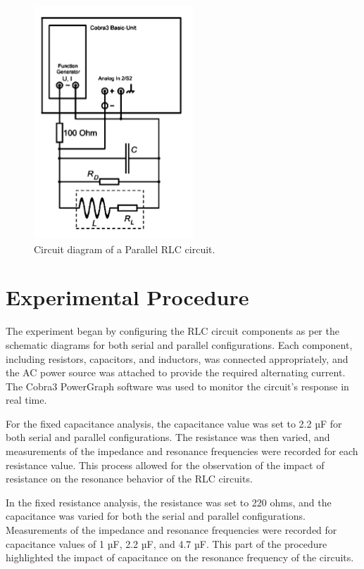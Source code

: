 \documentclass[journal]{IEEEtran}
\begin{document}
\begin{figure}[H]
    \centering
    \includegraphics[width=0.5\linewidth]{IMAGES/parallel_diagram.png}
    \caption{Circuit diagram of a Parallel RLC circuit.}
    \label{fig:parallel_circuit}
\end{figure}

\section{Experimental Procedure}
The experiment began by configuring the RLC circuit components as per the schematic diagrams for both serial and parallel configurations. Each component, including resistors, capacitors, and inductors, was connected appropriately, and the AC power source was attached to provide the required alternating current. The Cobra3 PowerGraph software was used to monitor the circuit's response in real time.

For the fixed capacitance analysis, the capacitance value was set to 2.2 µF for both serial and parallel configurations. The resistance was then varied, and measurements of the impedance and resonance frequencies were recorded for each resistance value. This process allowed for the observation of the impact of resistance on the resonance behavior of the RLC circuits.

In the fixed resistance analysis, the resistance was set to 220 ohms, and the capacitance was varied for both the serial and parallel configurations. Measurements of the impedance and resonance frequencies were recorded for capacitance values of 1 µF, 2.2 µF, and 4.7 µF. This part of the procedure highlighted the impact of capacitance on the resonance frequency of the circuits.
\end{document}
